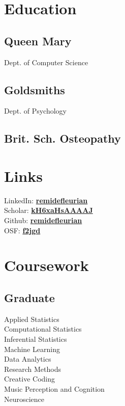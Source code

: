 \documentclass[]{deedy-resume-openfont}
\begin{document}

\begin{minipage}[t]{0.33\textwidth} 

\section{Education} 

\subsection{Queen Mary}
Dept. of Computer Science \\
\sectionsep

\subsection{Goldsmiths}
Dept. of Psychology \\
\sectionsep

\subsection{Brit. Sch. Osteopathy}
\sectionsep

\section{Links} 
LinkedIn: \href{https://www.linkedin.com/in/remidefleurian/}{\bf remidefleurian} \\
Scholar: \href{https://scholar.google.co.uk/citations?user=kH6xaHsAAAAJ}{\bf kH6xaHsAAAAJ} \\
Github: \href{https://github.com/remidefleurian/}{\bf remidefleurian} \\
OSF: \href{https://osf.io/f2jgd/}{\bf f2jgd}
\sectionsep

\section{Coursework}
\subsection{Graduate}
Applied Statistics \\
Computational Statistics \\
Inferential Statistics \\
Machine Learning \\
Data Analytics \\
Research Methods \\
Creative Coding \\
Music Perception and Cognition \\
Neuroscience
\sectionsep


\end{minipage}
\end{document}
